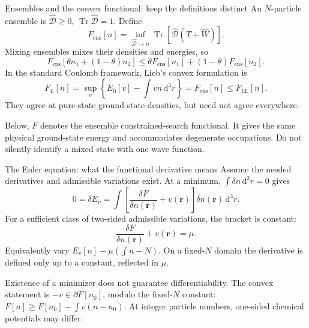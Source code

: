 \documentclass[aspectratio=169,10pt]{beamer}
\newcommand{\warnbox}[1]{\begin{tcolorbox}[colback=palewarm,colframe=warm,title={A trap to avoid}]#1\end{tcolorbox}}
\newcommand{\dftbox}[1]{\begin{tcolorbox}[colback=paleteal,colframe=teal,title={Key result}]#1\end{tcolorbox}}
\newcommand{\dd}{\,\mathrm d}
\newcommand{\rr}{\mathbf r}
\newcommand{\Tr}{\operatorname{Tr}}
\newcommand{\LL}{\mathrm{LL}}
\newcommand{\ens}{\mathrm{ens}}
\begin{document}
\begin{frame}{Ensembles and the convex functional: keep the definitions distinct}
An $N$-particle ensemble is $\hat{\mathcal D}\geq0$, $\Tr\hat{\mathcal D}=1$.
Define
\[
 F_{\ens}[n]=\inf_{\hat{\mathcal D}\to n}
          \Tr[\hat{\mathcal D}(\hat T+\hat W)].
\]
Mixing ensembles mixes their densities and energies, so
\[
 F_{\ens}[\theta n_1+(1-\theta)n_2]
 \leq\theta F_{\ens}[n_1]+(1-\theta)F_{\ens}[n_2].
\]
In the standard Coulomb framework, Lieb's convex formulation is
\[
 F_L[n]=\sup_v\left\{E_0[v]-\int vn\dd^3r\right\}=F_{\ens}[n]\leq F_{\LL}[n].
\]
They agree at pure-state ground-state densities, but need not agree everywhere.
\dftbox{Below, $F$ denotes the ensemble constrained-search functional.
It gives the same physical ground-state energy and accommodates degenerate
occupations. Do not silently identify a mixed state with one wave function.}
\end{frame}

\begin{frame}{The Euler equation: what the functional derivative means}
Assume the needed derivatives and admissible variations exist. At a minimum,
$\int\delta n\dd^3r=0$ gives
\[
 0=\delta E_v=\int\left[\frac{\delta F}{\delta n(\rr)}+v(\rr)\right]
                           \delta n(\rr)\dd^3r.
\]
For a sufficient class of two-sided admissible variations, the bracket is constant:
\[
 \boxed{\frac{\delta F}{\delta n(\rr)}+v(\rr)=\mu.}
\]
Equivalently vary $E_v[n]-\mu(\int n-N)$. On a fixed-$N$ domain the derivative
is defined only up to a constant, reflected in $\mu$.
\warnbox{Existence of a minimizer does not guarantee differentiability.
The convex statement is $-v\in\partial F[n_0]$, modulo the fixed-$N$
constant: $F[n]\geq F[n_0]-\int v(n-n_0)$. At integer particle numbers,
one-sided chemical potentials may differ.}
\end{frame}
\end{document}
